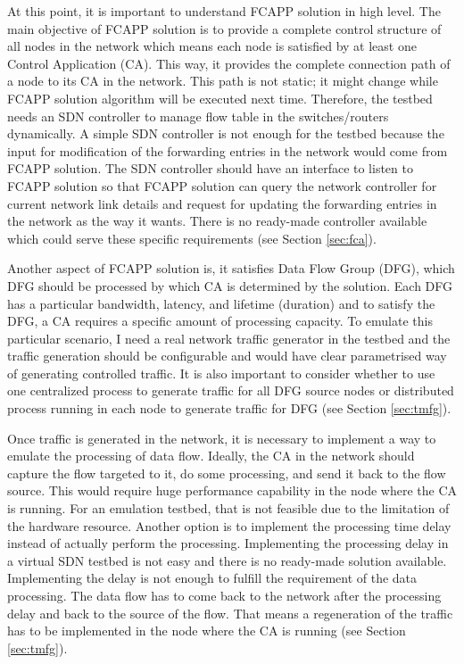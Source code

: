 At this point, it is important to understand FCAPP solution in high level. The main objective of FCAPP solution is to provide a complete control structure of all nodes in the network which means each node is satisfied by at least one Control Application (CA). This way, it provides the complete connection path of a node to its CA in the network. This path is not static; it might change while FCAPP solution algorithm will be executed next time. Therefore, the testbed needs an SDN controller to manage flow table in the switches/routers dynamically. A simple SDN controller is not enough for the testbed because the input for modification of the forwarding entries in the network would come from FCAPP solution. The SDN controller should have an interface to listen to FCAPP solution so that FCAPP solution can query the network controller for current network link details and request for updating the forwarding entries in the network as the way it wants. There is no ready-made controller available which could serve these specific requirements (see Section \ref{sec:fca}).

Another aspect of FCAPP solution is, it satisfies Data Flow Group (DFG), which DFG should be processed by which CA is determined by the solution. Each DFG has a particular bandwidth, latency, and lifetime (duration) and to satisfy the DFG, a CA requires a specific amount of processing capacity. To emulate this particular scenario, I need a real network traffic generator in the testbed and the traffic generation should be configurable and would have clear parametrised way of generating controlled traffic. It is also important to consider whether to use one centralized process to generate traffic for all DFG source nodes or distributed process running in each node to generate traffic for DFG (see Section \ref{sec:tmfg}).

Once traffic is generated in the network, it is necessary to implement a way to emulate the processing of data flow. Ideally, the CA in the network should capture the flow targeted to it, do some processing, and send it back to the flow source. This would require huge performance capability in the node where the CA is running. For an emulation testbed, that is not feasible due to the limitation of the hardware resource. Another option is to implement the processing time delay instead of actually perform the processing. Implementing the processing delay in a virtual SDN testbed is not easy and there is no ready-made solution available. Implementing the delay is not enough to fulfill the requirement of the data processing. The data flow has to come back to the network after the processing delay and back to the source of the flow. That means a regeneration of the traffic has to be implemented in the node where the CA is running (see Section \ref{sec:tmfg}).

